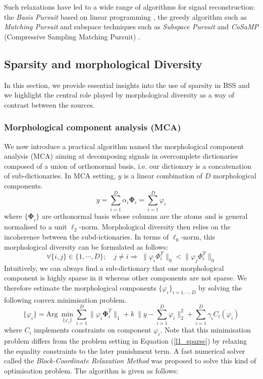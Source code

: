 Such relaxations have led to a wide range of algorithms for signal reconstruction: the \textit{Basis Pursuit} based on linear programming  \cite{BPAtomicDcomp}, the greedy algorithm such as \textit{Matching Pursuit} \cite{Mallat_Zhang1993} and subspace techniques such as \textit{Subspace Pursuit} \cite{WdaiSP} and \textit{CoSaMP} (Compressive
Sampling Matching Pursuit) \cite{CoSaMP2008}.




\subsection{Sparsity and morphological Diversity}
In this section, we provide essential insights into the use of sparsity in BSS and we highlight the central role played by morphological diversity as a way of contrast between the sources.

\subsubsection{Morphological component analysis (MCA)}
We now introduce a practical algorithm named the morphological component analysis (MCA) aiming at decomposing signals in overcomplete dictionaries composed of a union of orthonormal basis, i.e. our dictionary is a concatenation of sub-dictionaries. In MCA setting, $y$ is a linear combination of $D$ morphological components. 
\begin{equation}
    y = \sum_{i=1}^D  \alpha_i \mathbf{\Phi}_i = \sum_{i=1}^D \varphi_i
    \label{Eq_dictionary}
\end{equation}
where $\mathbf{\{\Phi}_i\}$ are orthonormal basis whose columns are the atoms and is general normalised to a unit $\ell_2$-norm. Morphological diversity then relies on the incoherence between the subd-ictionaries. In terms of $\ell_0$-norm, this morphological diversity can be formulated as follows:
\begin{equation}
    \forall\{i,j\} \in \{1,\cdots,D\};\quad j \neq i \Rightarrow \; \lVert \varphi_i \Phi_i^T \rVert_0 < \lVert \varphi_j \Phi_i^T \rVert_0
\end{equation}
Intuitively, we can always find a sub-dictionary that one morphological component is highly sparse in it whereas other components are not sparse. We therefore estimate the morphological components $\{\varphi_i\}_{i=1,\cdots,D}$ by solving the following convex minimisation problem.
\begin{equation}
    \{\varphi_i\} = \text{Arg} \: \min_{\{\varphi_i\}}\sum_{i=1}^D \lVert\varphi_i \mathbf{\Phi}_i^T \rVert_{1} + k \:\lVert y-\sum_{i=1}^D\varphi_i \rVert^2_2 +  \sum_{i=1}^D \gamma_i C_i (\varphi_i)
    \label{MCAequation}
\end{equation}
where $C_i$ implements constraints on component $\varphi_i$. Note that this minimisation problem differs from the problem setting in Equation (\ref{l1_sparse}) by relaxing the equality constraints to the later punishment term. A fast numerical solver called the \textit{Block-Coordinate Relaxation Method} \cite{BlockCoordinateMethod} was proposed to solve this kind of optimisation problem. 
The algorithm is given as follows:

